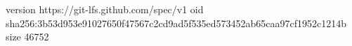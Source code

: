 version https://git-lfs.github.com/spec/v1
oid sha256:3b53d953e91027650f47567c2cd9ad5f535ed573452ab65caa97cf1952c1214b
size 46752
